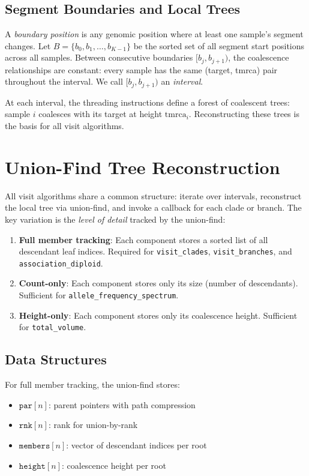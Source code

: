 \documentclass[11pt]{article}
\begin{document}
\subsection{Segment Boundaries and Local Trees}

A \emph{boundary position} is any genomic position where at least one
sample's segment changes.  Let $B = \{b_0, b_1, \ldots, b_{K-1}\}$ be the
sorted set of all segment start positions across all samples.  Between
consecutive boundaries $[b_j, b_{j+1})$, the coalescence relationships are
constant: every sample has the same (target, tmrca) pair throughout the
interval.  We call $[b_j, b_{j+1})$ an \emph{interval}.

At each interval, the threading instructions define a forest of coalescent
trees: sample $i$ coalesces with its target at height $\text{tmrca}_i$.
Reconstructing these trees is the basis for all visit algorithms.

\section{Union-Find Tree Reconstruction}

All visit algorithms share a common structure: iterate over intervals,
reconstruct the local tree via union-find, and invoke a callback for each
clade or branch.  The key variation is the \emph{level of detail} tracked by
the union-find:

\begin{enumerate}
\item \textbf{Full member tracking}: Each component stores a sorted list of
all descendant leaf indices.  Required for \texttt{visit\_clades},
\texttt{visit\_branches}, and \texttt{association\_diploid}.
\item \textbf{Count-only}: Each component stores only its size (number of
descendants).  Sufficient for \texttt{allele\_frequency\_spectrum}.
\item \textbf{Height-only}: Each component stores only its coalescence
height.  Sufficient for \texttt{total\_volume}.
\end{enumerate}

\subsection{Data Structures}

For full member tracking, the union-find stores:
\begin{itemize}
\item $\texttt{par}[n]$: parent pointers with path compression
\item $\texttt{rnk}[n]$: rank for union-by-rank
\item $\texttt{members}[n]$: vector of descendant indices per root
\item $\texttt{height}[n]$: coalescence height per root
\end{itemize}
\end{document}
